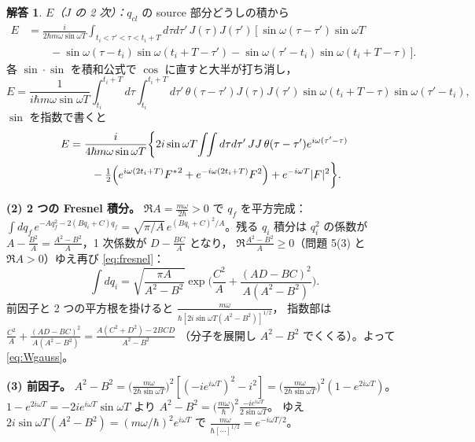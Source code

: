 \documentclass[dvipdfmx, uplatex]{jsarticle}
\theoremstyle{definition}
\newtheorem*{sol}{解答}
\begin{document}
\begin{sol}
\par\smallskip
\textit{$E$（$J$ の 2 次）：}$q_{cl}$ の source 部分どうしの積から
\begin{align*}
    E
    &=\frac{i}{2\hbar m\omega\sin\omega T}
    \int_{t_i<\tau'<\tau<t_i+T}\!\!\!d\tau d\tau'\,J(\tau)J(\tau')\,
    \big[\,\sin\omega(\tau-\tau')\sin\omega T\\
    &\qquad
    -\sin\omega(\tau-t_i)\sin\omega(t_i+T-\tau')
    -\sin\omega(\tau'-t_i)\sin\omega(t_i+T-\tau)\,\big].
\end{align*}
各 $\sin\cdot\sin$ を積和公式で $\cos$ に直すと大半が打ち消し，
\[
    E=\frac{1}{i\hbar m\omega\sin\omega T}
    \int_{t_i}^{t_i+T}\!\!d\tau\int_{t_i}^{t_i+T}\!\!d\tau'\,\theta(\tau-\tau')J(\tau)J(\tau')
    \sin\omega(t_i+T-\tau)\sin\omega(\tau'-t_i),
\]
$\sin$ を指数で書くと
\begin{align}
    E
    &=\frac{i}{4\hbar m\omega\sin\omega T}
    \bigg\{2i\sin\omega T\!\int\!\!\int d\tau d\tau'\,JJ\,\theta(\tau-\tau')e^{i\omega(\tau'-\tau)}
    \notag\\
    &\qquad
    -\tfrac12\Big(e^{i\omega(2t_i+T)}{F^*}^2+e^{-i\omega(2t_i+T)}F^2\Big)+e^{-i\omega T}|F|^2\bigg\}.
\label{eq:Esol}
\end{align}

\par\smallskip
\textbf{(2) 2 つの Fresnel 積分。}
$\Re A=\frac{m\omega}{2\hbar}>0$ で $q_f$ を平方完成：
$\int dq_f\,e^{-Aq_f^2-2(Bq_i+C)q_f}=\sqrt{\pi/A}\,e^{(Bq_i+C)^2/A}$。残る $q_i$ 積分は
$q_i^2$ の係数が $A-\frac{B^2}{A}=\frac{A^2-B^2}{A}$，1 次係数が $D-\frac{BC}{A}$ となり，
$\Re\frac{A^2-B^2}{A}\ge0$（問題 5(3) と $\Re A>0$）ゆえ再び \eqref{eq:fresnel}：
\[
    \int dq_i=\sqrt{\frac{\pi A}{A^2-B^2}}\exp\!\Big(\frac{C^2}{A}+\frac{(AD-BC)^2}{A(A^2-B^2)}\Big).
\]
前因子と 2 つの平方根を掛けると $\frac{m\omega}{\hbar[2i\sin\omega T(A^2-B^2)]^{1/2}}$，
指数部は $\frac{C^2}{A}+\frac{(AD-BC)^2}{A(A^2-B^2)}=\frac{A(C^2+D^2)-2BCD}{A^2-B^2}$
（分子を展開し $A^2-B^2$ でくくる）。よって \eqref{eq:Wgauss}。

\par\smallskip
\textbf{(3) 前因子。}
$A^2-B^2=\big(\frac{m\omega}{2\hbar\sin\omega T}\big)^2[(-ie^{i\omega T})^2-i^2]
=\big(\frac{m\omega}{2\hbar\sin\omega T}\big)^2(1-e^{2i\omega T})$。
$1-e^{2i\omega T}=-2ie^{i\omega T}\sin\omega T$ より
$A^2-B^2=\big(\frac{m\omega}{\hbar}\big)^2\frac{-ie^{i\omega T}}{2\sin\omega T}$。
ゆえ $2i\sin\omega T(A^2-B^2)=(m\omega/\hbar)^2e^{i\omega T}$ で
$\frac{m\omega}{\hbar[\cdots]^{1/2}}=e^{-i\omega T/2}$。


\end{sol}
\end{document}
